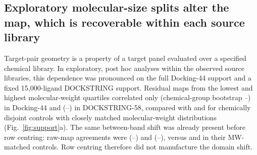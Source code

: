 \documentclass[11pt]{article}
\begin{document}
\subsection{Exploratory molecular-size splits alter the map, which is recoverable within each source library}

Target-pair geometry is a property of a target panel evaluated over a specified chemical
library. In exploratory, post hoc analyses within the observed source libraries, this dependence was pronounced on the full Docking-44 support and a fixed
15,000-ligand DOCKSTRING support. Residual maps from the lowest and highest molecular-weight
quartiles correlated only \DffMWDomainRho{} (chemical-group bootstrap
\DffMWDomainLow{}--\DffMWDomainHigh{}) in Docking-44 and \DsMWDomainRho{}
(\DsMWDomainLow{}--\DsMWDomainHigh{}) in DOCKSTRING-58, compared with
\DffMWDomainControl{} and \DsMWDomainControl{} for chemically disjoint controls with
closely matched molecular-weight distributions (Fig.~\ref{fig:support}a). The same
between-band shift was already present before row centring: raw-map agreements were
\DffMWRawDomainRho{} (\DffMWRawDomainLow{}--\DffMWRawDomainHigh{}) and
\DsMWRawDomainRho{} (\DsMWRawDomainLow{}--\DsMWRawDomainHigh{}), versus
\DffMWRawDomainControl{} and \DsMWRawDomainControl{} in their MW-matched controls. Row
centring therefore did not manufacture the domain shift.
\end{document}
